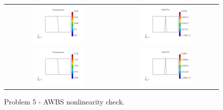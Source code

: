 \documentclass[review]{elsarticle}
\begin{document}
\begin{figure}[tbh]
  \begin{center}
    \begin{tabular}{cc}
      \includegraphics[width=0.5\textwidth]{figs/temperature_p51DT1000.png} &
      \includegraphics[width=0.5\textwidth]{figs/hflux_p51DT1000.png} \\
      \includegraphics[width=0.5\textwidth]{figs/temperature_p51DT1100.png} &
      \includegraphics[width=0.5\textwidth]{figs/hflux_p51DT1100.png}
    \end{tabular}
  \caption{
    Problem 5 - AWBS nonlinearity check.
  }
  \end{center}
  \label{fig:p51D_AWBS_nonlinearity}
\end{figure}
\end{document}
